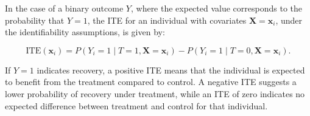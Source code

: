 % 
% 
% 
% 
% 
% 
% 
% 

\medskip

In the case of a binary outcome $Y$, where the expected value corresponds to the probability that $Y = 1$, the ITE for an individual with covariates $\mathbf{X} = \mathbf{x}_i$, under the identifiability assumptions, is given by:

\medskip

\begin{equation}
\text{ITE}(\mathbf{x}_i) = P(Y_i = 1 \mid T = 1, \mathbf{X} = \mathbf{x}_i) - P(Y_i = 1 \mid T = 0, \mathbf{X} = \mathbf{x}_i).
\label{eq:ITE_binary}
\end{equation}

\medskip

If $Y = 1$ indicates recovery, a positive ITE means that the individual is expected to benefit from the treatment compared to control. A negative ITE suggests a lower probability of recovery under treatment, while an ITE of zero indicates no expected difference between treatment and control for that individual.



\medskip




